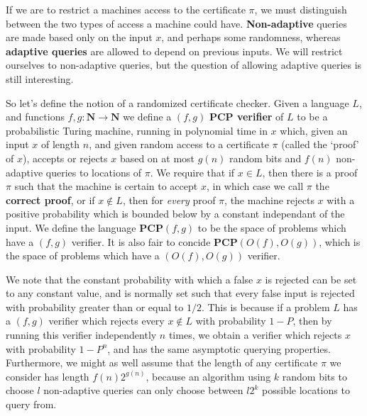 If we are to restrict a machines access to the certificate $\pi$, we must distinguish between the two types of access a machine could have. {\bf Non-adaptive} queries are made based only on the input $x$, and perhaps some randomness, whereas {\bf adaptive queries} are allowed to depend on previous inputs. We will restrict ourselves to non-adaptive queries, but the question of allowing adaptive queries is still interesting.

So let's define the notion of a randomized certificate checker. Given a language $L$, and functions $f,g: \mathbf{N} \to \mathbf{N}$ we define a $(f,g)$ {\bf PCP verifier} of $L$ to be a probabilistic Turing machine, running in polynomial time in $x$ which, given an input $x$ of length $n$, and given random access to a certificate $\pi$ (called the `proof' of $x$), accepts or rejects $x$ based on at most $g(n)$ random bits and $f(n)$ non-adaptive queries to locations of $\pi$. We require that if $x \in L$, then there is a proof $\pi$ such that the machine is certain to accept $x$, in which case we call $\pi$ the {\bf correct proof}, or if $x \not \in L$, then for {\it every} proof $\pi$, the machine rejects $x$ with a positive probability which is bounded below by a constant independant of the input. We define the language $\mathbf{PCP}(f,g)$ to be the space of problems which have a $(f,g)$ verifier. It is also fair to concide $\mathbf{PCP}(O(f),O(g))$, which is the space of problems which have a $(O(f),O(g))$ verifier.

We note that the constant probability with which a false $x$ is rejected can be set to any constant value, and is normally set such that every false input is rejected with probability greater than or equal to $1/2$. This is because if a problem $L$ has a $(f, g)$ verifier which rejects every $x \not \in L$ with probability $1 - P$, then by running this verifier independently $n$ times, we obtain a verifier which rejects $x$ with probability $1 - P^n$, and has the same asymptotic querying properties. Furthermore, we might as well assume that the length of any certificate $\pi$ we consider has length $f(n)2^{g(n)}$, because an algorithm using $k$ random bits to choose $l$ non-adaptive queries can only choose between $l2^k$ possible locations to query from.

